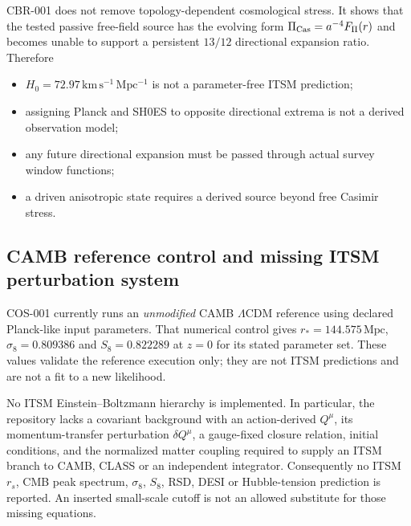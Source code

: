CBR-001 does not remove topology-dependent cosmological stress.  It shows that
the tested passive free-field source has the evolving form
$\Pi_{\rm Cas}=a^{-4}F_\Pi(r)$ and becomes unable to support a persistent
$13/12$ directional expansion ratio.  Therefore
\begin{itemize}
\item $H_0=72.97\,\mathrm{km\,s^{-1}\,Mpc^{-1}}$ is not a parameter-free ITSM
prediction;
\item assigning Planck and SH0ES to opposite directional extrema is not a
derived observation model;
\item any future directional expansion must be passed through actual survey
window functions;
\item a driven anisotropic state requires a derived source beyond free Casimir
stress.
\end{itemize}

\subsection{CAMB reference control and missing ITSM perturbation system}

COS-001 currently runs an \emph{unmodified} CAMB $\Lambda$CDM reference using
declared Planck-like input parameters.  That numerical control gives
$r_*=144.575\,\mathrm{Mpc}$, $\sigma_8=0.809386$ and
$S_8=0.822289$ at $z=0$ for its stated parameter set.  These values validate
the reference execution only; they are not ITSM predictions and are not a fit
to a new likelihood.

No ITSM Einstein--Boltzmann hierarchy is implemented.  In particular, the
repository lacks a covariant background with an action-derived $Q^\mu$, its
momentum-transfer perturbation $\delta Q^\mu$, a gauge-fixed closure relation,
initial conditions, and the normalized matter coupling required to supply an
ITSM branch to CAMB, CLASS or an independent integrator.  Consequently no
ITSM $r_s$, CMB peak spectrum, $\sigma_8$, $S_8$, RSD, DESI or
Hubble-tension prediction is reported.  An inserted small-scale cutoff is not
an allowed substitute for those missing equations.

